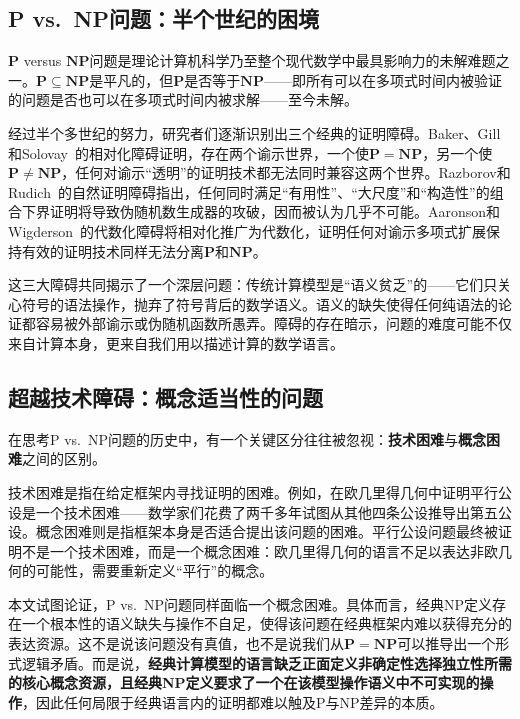 \documentclass{ctexart}
\begin{document}
	\subsection{P vs.\ NP问题：半个世纪的困境}
	
	$\mathbf{P}$ versus $\mathbf{NP}$问题\cite{cook1971,levin1973}是理论计算机科学乃至整个现代数学中最具影响力的未解难题之一。$\mathbf{P} \subseteq \mathbf{NP}$是平凡的，但$\mathbf{P}$是否等于$\mathbf{NP}$——即所有可以在多项式时间内被验证的问题是否也可以在多项式时间内被求解——至今未解。
	
	经过半个多世纪的努力，研究者们逐渐识别出三个经典的证明障碍。Baker、Gill和Solovay~\cite{baker1975}的相对化障碍证明，存在两个谕示世界，一个使$\mathbf{P}=\mathbf{NP}$，另一个使$\mathbf{P}\neq\mathbf{NP}$，任何对谕示``透明''的证明技术都无法同时兼容这两个世界。Razborov和Rudich~\cite{razborov1997}的自然证明障碍指出，任何同时满足``有用性''、``大尺度''和``构造性''的组合下界证明将导致伪随机数生成器的攻破，因而被认为几乎不可能。Aaronson和Wigderson~\cite{aaronson2009}的代数化障碍将相对化推广为代数化，证明任何对谕示多项式扩展保持有效的证明技术同样无法分离$\mathbf{P}$和$\mathbf{NP}$。
	
	这三大障碍共同揭示了一个深层问题：传统计算模型是``语义贫乏''的——它们只关心符号的语法操作，抛弃了符号背后的数学语义。语义的缺失使得任何纯语法的论证都容易被外部谕示或伪随机函数所愚弄。障碍的存在暗示，问题的难度可能不仅来自计算本身，更来自我们用以描述计算的数学语言。
	
	\subsection{超越技术障碍：概念适当性的问题}
	
	在思考P vs.\ NP问题的历史中，有一个关键区分往往被忽视：\textbf{技术困难}与\textbf{概念困难}之间的区别。
	
	技术困难是指在给定框架内寻找证明的困难。例如，在欧几里得几何中证明平行公设是一个技术困难——数学家们花费了两千多年试图从其他四条公设推导出第五公设。概念困难则是指框架本身是否适合提出该问题的困难。平行公设问题最终被证明不是一个技术困难，而是一个概念困难：欧几里得几何的语言不足以表达非欧几何的可能性，需要重新定义``平行''的概念。
	
	本文试图论证，P vs.\ NP问题同样面临一个概念困难。具体而言，经典NP定义存在一个根本性的语义缺失与操作不自足，使得该问题在经典框架内难以获得充分的表达资源。这不是说该问题没有真值，也不是说我们从$\mathbf{P}=\mathbf{NP}$可以推导出一个形式逻辑矛盾。而是说，\textbf{经典计算模型的语言缺乏正面定义非确定性选择独立性所需的核心概念资源，且经典NP定义要求了一个在该模型操作语义中不可实现的操作}，因此任何局限于经典语言内的证明都难以触及P与NP差异的本质。
	
\end{document}
